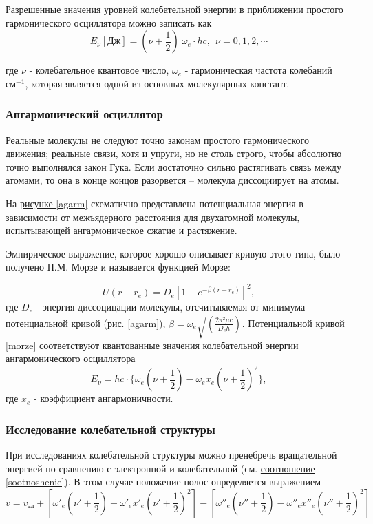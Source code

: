 \documentclass{article}
\begin{document}
 Разрешенные значения уровней колебательной энергии в приближении простого гармонического осциллятора можно записать как
 \begin{equation}
     E_{\nu}[Дж] = (\nu +\frac{1}{2})~\omega_e \cdot h c, ~~ \nu = 0,1,2,\dotsb
 \end{equation}
  
 где $\nu$ - колебательное квантовое число, $\omega_e$ - гармоническая частота колебаний $ см^{-1}$, которая является
одной из основных молекулярных констант.


\subsubsection*{Ангармонический осциллятор}
Реальные молекулы не следуют точно законам простого гармонического движения; реальные связи, хотя и упруги, но не столь строго, чтобы  абсолютно  точно  выполнялся  закон  Гука.  Если  достаточно сильно  растягивать  связь  между  атомами,  то  она  в  конце  концов разорвется – молекула диссоциирует на атомы. 

На \hyperref[agarm]{рисунке \ref*{agarm}}  схематично представлена потенциальная энергия в зависимости от межъядерного расстояния для двухатомной молекулы, испытывающей  ангармоническое сжатие  и  растяжение.  

Эмпирическое выражение, которое хорошо описывает кривую этого типа, было получено П.М. Морзе и называется функцией Морзе:

\begin{equation}
\label{morze}
    U(r-r_e) = D_e[1-e^{-\beta(r-r_e)}]^2,
\end{equation}
где $D_e$ - энергия диссоцицации молекулы, отсчитываемая от минимума потенциальной кривой (\hyperref[agarm]{рис. \ref*{agarm}}),  
$\beta = \omega_e\sqrt{(\frac{2\pi ^2 \mu c}{D_e h})}$. \hyperref[morze]{ Потенциальной кривой \ref*{morze}} соответствуют квантованные значения колебательной энергии ангармонического осциллятора 
\begin{equation}
    E_\nu = hc\cdot \{ \omega_e(\nu + \frac{1}{2}) - \omega_e x_e(\nu + \frac{1}{2})^2 \},
\end{equation}
где $x_e$ - коэффициент ангармоничности. 

\subsubsection*{Исследование колебательной структуры}
При исследованиях колебательной структуры можно пренебречь вращательной энергией по сравнению с электронной и колебательной (см. \hyperref[sootnoshenie]{соотношение \ref*{sootnoshenie}}). В этом случае положение полос определяется выражением
\begin{equation}
\label{eq:v(nu)}
    v = v_{эл} + [\omega'_e(\nu'+\frac{1}{2}) - \omega'_e x'_e(\nu'+\frac{1}{2})^2] - [\omega''_e(\nu''+\frac{1}{2}) - \omega''_e x''_e(\nu''+\frac{1}{2})^2]
\end{equation}
\end{document}

